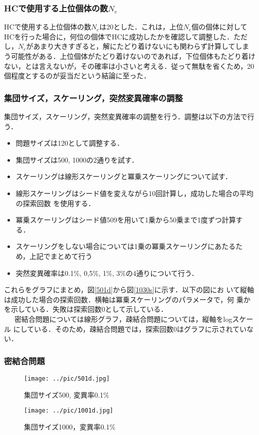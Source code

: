 \documentclass[a4j]{jarticle}
\begin{document}
\subsubsection{HCで使用する上位個体の数$N_e$}
HCで使用する上位個体の数$N_e$は20とした．これは，上位$N_e$個の個体に対してHCを行った場合に，何位の個体でHCに成功したかを確認して調整した．ただし，$N_e$があまり大きすぎると，解にたどり着けないにも関わらず計算してしまう可能性がある．上位個体がたどり着けないのであれば，下位個体もたどり着けない，とは言えないが，その確率は小さいと考える．従って無駄を省くため，20個程度とするのが妥当だという結論に至った．

\subsubsection{集団サイズ，スケーリング，突然変異確率の調整}
集団サイズ，スケーリング，突然変異確率の調整を行う．調整は以下の方法で行う．
\begin{itemize}
 \item 問題サイズは120として調整する．
 \item 集団サイズは500, 1000の2通りを試す．
 \item スケーリングは線形スケーリングと冪乗スケーリングについて試す．
 \item 線形スケーリングはシード値を変えながら10回計算し，成功した場合の平均の探索回数
       を使用する．
 \item 冪乗スケーリングはシード値509を用いて1乗から50乗まで1度ずつ計算す
       る．
 \item スケーリングをしない場合については1乗の冪乗スケーリングにあたるた
       め，上記でまとめて行う
 \item 突然変異確率は0.1\%, 0,5\%, 1\%, 3\%の4通りについて行う．
\end{itemize}
これらをグラフにまとめ，図\ref{501d}から図\ref{1030s}に示す．以下の図にお
いて縦軸は成功した場合の探索回数．横軸は冪乗スケーリングのパラメータで，何
乗かを示している．失敗は探索回数0として示している．\\\ \ \ 
密結合問題については線形グラフ，疎結合問題については，縦軸をlogスケール
にしている．そのため，疎結合問題では，探索回数0はグラフに示されていない．

\subsubsection*{密結合問題}
\begin{figure}[H]
 \begin{minipage}{0.5\hsize}
  \begin{center}
   \texttt{[image: ../pic/501d.jpg]}
  \end{center}
  \caption{集団サイズ500, 変異率0.1\%}
  \label{501d}
 \end{minipage}
 \begin{minipage}{0.5\hsize}
  \begin{center}
   \texttt{[image: ../pic/1001d.jpg]}
  \end{center}
  \caption{集団サイズ1000，変異率0.1\%}
  \label{1001d}
 \end{minipage}
\end{figure}
\end{document}
